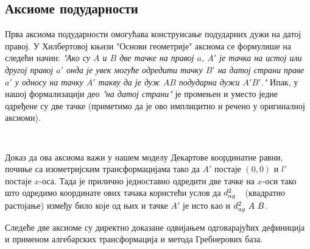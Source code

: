 \subsection{Аксиоме подударности}
Прва аксиома подударности омогућава конструисање подударних дужи на
датој правој. У Хилбертовој књизи "Основи геометрије" \cite{hilbert}
аксиома се формулише на следећи начин: \emph{"Ако су $A$ и $B$ две
  тачке на правој $a$, $A'$ је тачка на истој или другој правој $a'$
  онда је увек могуће одредити тачку $B'$ на датој страни праве $a'$ у
  односу на тачку $A'$ такву да је дуж $AB$ подударна дужи $A'B'$."}
Ипак, у нашој формализацији део \emph{"на датој страни"} је промењен и
уместо једне одређене су две тачке (приметимо да је ово имплицитно и
речено у оригиналној аксиоми).

{\tt
\begin{tabbing}
\hspace{5mm}\=assumes\ \=\kill
\textbf{lemma} "}$A \neq B\,\wedge\,\inh{A}{l}\,\wedge\,\inh{B}{l}\,\wedge\,\inh{A'}{l'}\ \longrightarrow$\\
\> $\exists B'\, C'.\ \inh{B'}{l'}\,\wedge\,\inh{C'}{l'}\,\wedge\,\beth{C'}{A'}{B'}\,\wedge\,\congrh{A}{B}{A'}{B'}\,\wedge\,\congrh{A}{B}{A'}{C'}$"}
\end{tabbing}
}

Доказ да ова аксиома важи у нашем моделу Декартове координатне равни,
почиње са изометријским трансформацијама тако да $A'$ постаје $(0, 0)$
и $l'$ постаје $x$-оса. Тада је прилично једноставно одредити две
тачке на $x$-оси тако што одредимо координате ових тачака користећи
услов да $d^2_{ag}\ \ $ (квадратно растојање) између било које од њих
и тачке $A'$ је исто као и $d^2_{ag}\ A\ B$.

Следеће две аксиоме су директно доказане одвијањем одговарајућих
дефиниција и применом алгебарских трансформација и метода Гребнерових
база.

{\tt
\begin{tabbing}
\hspace{20mm}\=assumes\ \=\kill
\textbf{lemma} "$\congrh{A}{B}{A'}{B'}\,\wedge\,\congrh{A}{B}{A''}{B''}\ \longrightarrow\ \congrh{A'}{B'}{A''}{B''}$"\\
\textbf{lemma} "$\beth{A}{B}{C}\,\wedge\,\beth{A'}{B'}{C'}\,\wedge\,\congrh{A}{B}{A'}{B'}\,\wedge\,\congrh{B}{C}{B'}{C'} \ \longrightarrow$}\\ 
\>$\congrh{A}{C}{A'}{C'}$"}
\end{tabbing}
}

